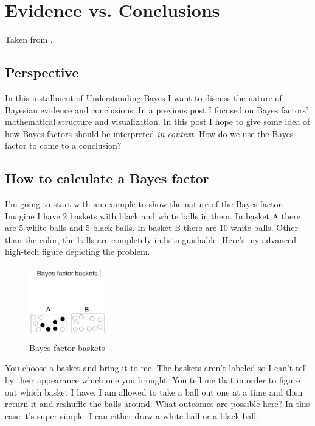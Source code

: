 \section{Evidence vs. Conclusions}
\label{sec:Evidencevs.Conclusions}

Taken from  \cite{etz2015c}.

\subsection{Perspective}

In this installment of Understanding Bayes I want to discuss the nature of Bayesian evidence and conclusions. In a previous post I focused on Bayes factors' mathematical structure and visualization. In this post I hope to give some idea of how Bayes factors should be interpreted \textit{in context}. How do we use the Bayes factor to come to a conclusion?

\subsection{How to calculate a Bayes factor}

I'm going to start with an example to show the nature of the Bayes factor. Imagine I have 2 baskets with black and white balls in them. In basket A there are 5 white balls and 5 black balls. In basket B there are 10 white balls. Other than the color, the balls are completely indistinguishable. Here's my advanced high-tech figure depicting the problem.

\begin{figure}[h]
\centering
\includegraphics[width=0.3\textwidth]{pic/p05c03-snip17.png}
\caption{Bayes factor baskets}
\label{fig:p05c03-snip17}
\end{figure}

You choose a basket and bring it to me. The baskets aren't labeled so I can't tell by their appearance which one you brought. You tell me that in order to figure out which basket I have, I am allowed to take a ball out one at a time and then return it and reshuffle the balls around. What outcomes are possible here? In this case it's super simple: I can either draw a white ball or a black ball.

